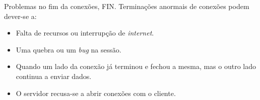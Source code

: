 Problemas no fim da conexões, FIN.
Terminações anormais de conexões podem dever-se a:
\begin{itemize}
    \item Falta de recursos ou interrupção de \textit{internet}.
    \item Uma quebra ou um \textit{bug} na sessão.
    \item Quando um lado da conexão já terminou e fechou a mesma, mas o outro lado continua a enviar dados.
    \item O servidor recusa-se a abrir conexões com o cliente.
\end{itemize}